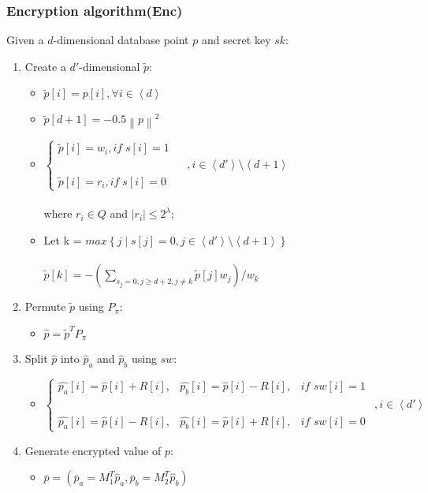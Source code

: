 \documentclass[12pt,english,hidelinks]{article}
\begin{document}
\subsubsection{Encryption algorithm(Enc)}
Given a $d$-dimensional database point $p$ and secret key $sk$:
\begin{enumerate}
\item Create a $d'$-dimensional $\tilde p$:
\begin{itemize}
    \item $\tilde{p}[i] = p[i],\forall i \in \left \langle d \right \rangle$
    \item $\tilde{p}[d+1] = -0.5\left \|  p\right \|^{2}$
    \item
    $\left\{\begin{matrix}
\tilde{p}[i] = w_i,if\;s[i] = 1 & &\\ 
 & & ,i\in \left \langle d' \right \rangle \setminus  \left \langle d+1 \right \rangle \\
\tilde{p}[i] = r_i,if\;s[i] = 0 & &
\end{matrix}\right.$
\\
\\
where $r_i\in Q$ and $\left|r_i\right|\leq 2^\lambda$;
    \item
    Let k = $max\left \{ j\mid s\left [ j \right ] = 0,j\in\left \langle d' \right \rangle\setminus \left \langle d+1 \right \rangle \right \}$
    \\
    \\
$    \tilde{p}\left [ k \right ] = -\left ( \sum\limits_{s_j=0,j\geq d+2,j\neq k}^{}\tilde{p}\left [ j \right ]w_j\right)/w_k$
\end{itemize}
\item
Permute $\tilde{p}$ using $P_\pi$:
\begin{itemize}
\item 
$\hat{p} =\tilde{p}^{T}P_\pi $
\end{itemize}
\item
Split $\hat{p}$ into $\hat{p}_a$ and $\hat{p}_b$ using $sw$:
\begin{itemize}
\item 
$\left\{\begin{matrix}
 \hat{p_a}\left [ i \right ] = \hat{p}\left [ i \right ] + R\left [ i \right ],& \hat{p_b}\left [ i \right ] = \hat{p}\left [ i \right ] - R\left [ i \right ],&if\,\,sw\left [ i \right ]=1 &\\ 
 & & &,i\in \left \langle d' \right \rangle  \\
\hat{p_a}\left [ i \right ] = \hat{p}\left [ i \right ] - R\left [ i \right ],&
 \hat{p_b}\left [ i \right ] = \hat{p}\left [ i \right ] + R\left [ i \right ],&if\,\,sw\left [ i \right ]=0 &
\end{matrix}\right.$
\end{itemize}
\item
Generate encrypted value of $p$:
\begin{itemize}
\item $\overline{p}=\left ( \overline{p}_{a} = M^{T}_{1}\hat{p}_{a},\overline{p}_{b} = M^{T}_{2}\hat{p}_{b}\right )$
\end{itemize}
\end{enumerate}
\end{document}
